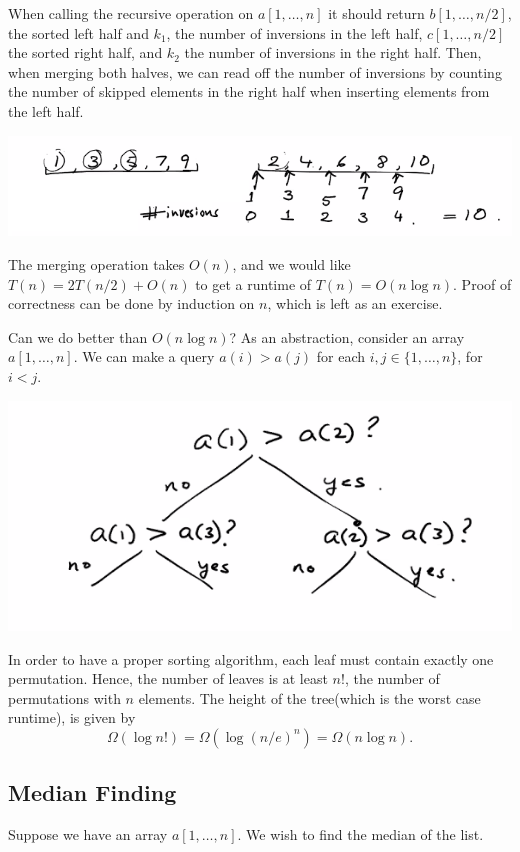 \documentclass[11pt]{scrartcl}
\begin{document}
When calling the recursive operation on $a[1, \dots, n]$ it should return $b[1, \dots, n/2]$, the sorted left half and $k_1$, the number of inversions in the left half, $c[1, \dots, n/2]$ the sorted right half, and $k_2$ the number of inversions in the right half.  Then, when merging both halves, we can read off the number of inversions by counting the number of skipped elements in the right half when inserting elements from the left half.
\begin{center}
\includegraphics[scale=1]{countInv.png}
\end{center}
The merging operation takes $O(n)$, and we would like $T(n) = 2T(n/2) + O(n)$ to get a runtime of $T(n) = O(n \log n)$.  Proof of correctness can be done by induction on $n$, which is left as an exercise.  

Can we do better than $O(n \log n)$?  As an abstraction, consider an array $a[1, \dots, n]$. 
 We can make a query $a(i) > a(j)$ for each $i, j \in\{1, \dots, n\}$, for $i < j$.
\begin{center}
\includegraphics[scale=1]{sort.png}
\end{center}
In order to have a proper sorting algorithm, each leaf must contain exactly one permutation.  Hence, the number of leaves is at least $n!$, the number of permutations with $n$ elements.  The height of the tree(which is the worst case runtime), is given by $$\Omega(\log n!) = \Omega(\log (n/e)^n) = \Omega(n \log n).$$
\subsection{Median Finding}
Suppose we have an array $a[1, \dots, n]$.  We wish to find the median of the list.  
\end{document}
